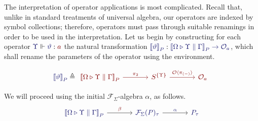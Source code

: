 \documentclass[11pt]{article}
\theoremstyle{definition}
\theoremstyle{remark}
\numberwithin{equation}{section}
\def\IModeColorName{MidnightBlue}
\def\OModeColorName{Maroon}
\newcommand\IMode[1]{{\color{\IModeColorName}{#1}}}
\newcommand\OMode[1]{{\color{\OModeColorName}{#1}}}
\newcommand\Of[2]{\IMode{#1}: \IMode{#2}}
\newcommand\Operators{\mathcal{O}}
\newcommand\IsOperator[3]{\IMode{#1}\Vdash\IMode{#2}: \OMode{#3}}
\newcommand\FLift[2]{
  \Operators\langle#1%
  \ifthenelse{\equal{#2}{}}{}{, #2}\rangle%
}
\newcommand\Define[2]{\IMode{#1}\triangleq\OMode{#2}}
\newcommand\SigFun[1]{\mathcal{F}_{#1}}
\newcommand\SemBrackets[1]{\left\llbracket#1\right\rrbracket}
\begin{document}
The interpretation of operator applications is most complicated. Recall that,
unlike in standard treatments of universal algebra, our operators are indexed
by symbol collections; therefore, operators must pass through suitable
renamings in order to be used in the interpretation. Let us begin by
constructing for each operator $\IsOperator{\Upsilon}{\vartheta}{a}$ the
natural transformation
$\Of{\SemBrackets{\vartheta}_P}{\SemBrackets{\Omega\triangleright\Upsilon\parallel\Gamma}_P
\to\Operators_{a}}$, which shall rename the parameters of the operator using
the environment.

\[
  \Define{
    \SemBrackets{\vartheta}_P
  }{
   \begin{tikzcd}[ampersand replacement = \&, sep=large]
     {\SemBrackets{\Omega\triangleright\Upsilon\parallel\Gamma}_P} \arrow[r, "\pi_2"]
     \& {S^{\{\Upsilon\}}} \arrow[r, "\FLift{\pi_{(-)}}{}"]
     \& {\Operators_a}
   \end{tikzcd}
 }
\]

We will proceed using the initial $\SigFun{\Sigma}$-algebra $\alpha$, as
follows.
\[
   \begin{tikzcd}[ampersand replacement = \&, sep=large]
     {\IMode{\SemBrackets{\Omega\triangleright\Upsilon\parallel\Gamma}_P}} \arrow[r, "\OMode{\beta}"]
     \& {\IMode{\SigFun{\Sigma}(P)_\tau}} \arrow[r, "\IMode{\alpha}"]
     \& {\IMode{P_\tau}}
   \end{tikzcd}
\]
\end{document}
